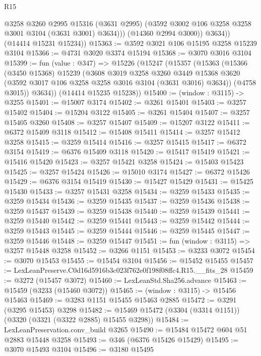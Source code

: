 \begin{lexlean}{R15}
\begin{coremodule}
                @3258
                @3260
                @2995
                @15316
                (@3631 @2995)
                (@3592 @3002 @106 @3258 @3258 @3001 @3104 (@3631 @3001) @3634)))
            (@14360 @2994 @3000))
          @3634))
      (@14414 @15231 @15234))
@15363 := @3592 @3021 @106 @15195 @3258 @15239 @3104
@15366 := @4731 @3020 @3374 @15194
@15368 := @3070 @3016 @3104
@15399 := fun (value : @347) =>
  @15226
    (@15247
      (@15357
        (@15363
          (@15366
            (@3450 @15368)
            @15239
            (@3608
              @3019
              @3258
              @3260
              @3449
              @15368
              @3620
              (@3592 @3017 @106 @3258 @3258 @3016 @3104 (@3631 @3016) @3634))
            (@4758 @3015))
          @3634))
      (@14414 @15235 @15238))
@15400 := (window : @3115) -> @3255
@15401 := @15007 @3174
@15402 := @3261 @15401
@15403 := @3257 @15402
@15404 := @15204 @3122
@15405 := @3261 @15404
@15407 := @3257 @15405 @3260
@15408 := @3257 @15407
@15409 := @15207 @3122
@15411 := @6372 @15409 @3118
@15412 := @15408 @15411
@15414 := @3257 @15412 @3258
@15415 := @3259 @15414
@15416 := @3257 @15415
@15417 := @6372 @3154
@15419 := @6376 @15409 @3118
@15420 := @15417 @15419
@15421 := @15416 @15420
@15423 := @3257 @15421 @3258
@15424 := @15403 @15423
@15425 := @3257 @15424
@15426 := @15010 @3174
@15427 := @6372 @15426
@15429 := @6376 @3154 @15419
@15430 := @15427 @15429
@15431 := @15425 @15430
@15433 := @3257 @15431 @3258
@15434 := @3259 @15433
@15435 := @3259 @15434
@15436 := @3259 @15435
@15437 := @3259 @15436
@15438 := @3259 @15437
@15439 := @3259 @15438
@15440 := @3259 @15439
@15441 := @3259 @15440
@15442 := @3259 @15441
@15443 := @3259 @15442
@15444 := @3259 @15443
@15445 := @3259 @15444
@15446 := @3259 @15445
@15447 := @3259 @15446
@15448 := @3259 @15447
@15451 := fun (window : @3115) => @3257 @15448 @3258
@15452 := @3266 @1151
@15453 := @3233 @3072
@15454 := @3070 @15453
@15455 := @15454 @3104
@15456 := @15452 @15455
@15457 := LexLeanPreserve.C0d16d5916b3c023f762e0f198f08ffc4.R15.__fits_28
@15459 := @3272 (@15457 @3072)
@15460 := LexLeanStd.Sha256.advance
@15463 := @15459 (@3233 (@15460 @3072))
@15465 := (window : @3115) -> @15456 @15463
@15469 := @3283 @1151 @15455 @15463 @2885
@15472 := @3291 (@3295 @15453) @3298
@15482 := @15469 @15472 (@3304 (@3314 @1151)) (@3320 (@3321 (@3322 @2885) @15455 @3298))
@15484 := LexLeanPreservation.conv_build @3265
@15490 := @15484 @15472 @604 @51 @2883 @15448 @3258
@15493 := @346 (@6376 @15426 @15429)
@15495 := @3070 @15493 @3104
@15496 := @3180 @15495

\end{coremodule}
\end{lexlean}

